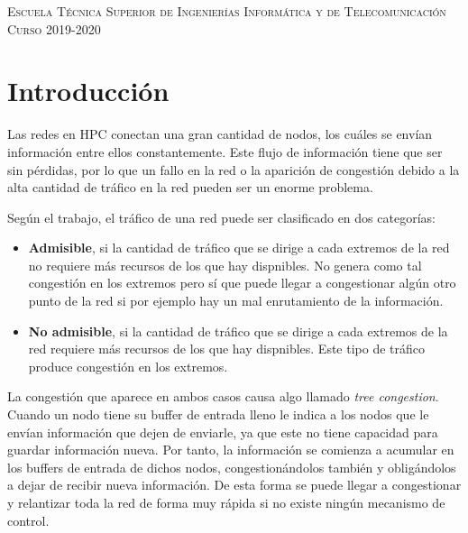 \documentclass[11pt,a4paper]{article}
\begin{document}
\begin{titlepage}
\begin{minipage}{\textwidth}
\vspace{0.7cm}
\textsc{Escuela Técnica Superior de Ingenierías Informática y de Telecomunicación}\\
\vspace{1cm}
\textsc{Curso 2019-2020}
\end{minipage}
\end{titlepage}

\tableofcontents
\thispagestyle{empty}				%

\newpage

\setlength{\parskip}{1em}

\section{Introducción}

Las redes en HPC conectan una gran cantidad de nodos, los cuáles se envían
información entre ellos constantemente. Este flujo de información tiene
que ser sin pérdidas, por lo que un fallo en la red o la aparición de congestión
debido a la alta cantidad de tráfico en la red pueden ser un enorme problema.

Según el trabajo, el tráfico de una red puede ser clasificado en dos categorías:

\begin{itemize}[label=\textbullet]
	\item \textbf{Admisible}, si la cantidad de tráfico que se dirige a cada extremos de la red
	no requiere más recursos de los que hay dispnibles. No genera como tal congestión
	en los extremos pero sí que puede llegar a congestionar algún otro punto de la red
	si por ejemplo hay un mal enrutamiento de la información.
	\item \textbf{No admisible}, si la cantidad de tráfico que se dirige a cada extremos de la red
	requiere más recursos de los que hay dispnibles. Este tipo de tráfico produce
	congestión en los extremos.
\end{itemize}

La congestión que aparece en ambos casos causa algo llamado \textit{tree congestion}.
Cuando un nodo tiene su buffer de entrada lleno le indica
a los nodos que le envían información que dejen de enviarle, ya que este no tiene capacidad
para guardar información nueva. Por tanto, la información se comienza a acumular en los buffers 
de entrada de dichos nodos, congestionándolos también y obligándolos a dejar de recibir
nueva información. De esta forma se puede llegar a congestionar y relantizar toda la red
de forma muy rápida si no existe ningún mecanismo de control.
\end{document}
